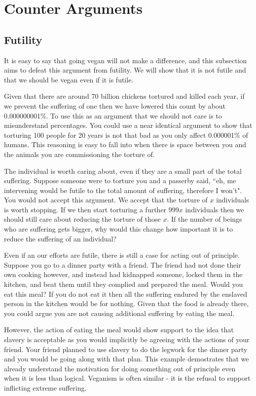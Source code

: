 \section{Counter Arguments}
\label{sec:CounterArguments}

\subsection{Futility}

It is easy to say that going vegan will not make a difference, and this subsection aims to defeat this argument from futility. We will show that it is not futile and that we should be vegan even if it is futile.

Given that there are around 70 billion chickens tortured and killed each year, if we prevent the suffering of one then we have lowered this count by about 0.000000001\%. To use this as an argument that we should not care is to misunderstand percentages. You could use a near identical argument to show that torturing 100 people for 20 years is not that bad as you only affect 0.000001\% of humans. This reasoning is easy to fall into when there is space between you and the animals you are commissioning the torture of.

The individual is worth caring about, even if they are a small part of the total suffering. Suppose someone were to torture you and a passerby said, ``eh, me intervening would be futile to the total amount of suffering, therefore I won't". You would not accept this argument. We accept that the torture of $x$ individuals is worth stopping. If we then start torturing a further $999x$ individuals then we should still care about reducing the torture of those $x$. If the number of beings who are suffering gets bigger, why would this change how important it is to reduce the suffering of an individual?

Even if an our efforts are futile, there is still a case for acting out of principle. Suppose you go to a dinner party with a friend. The friend had not done their own cooking however, and instead had kidnapped someone, locked them in the kitchen, and beat them until they complied and prepared the meal. Would you eat this meal? If you do not eat it then all the suffering endured by the enslaved person in the kitchen would be for nothing. Given that the food is already there, you could argue you are not causing additional suffering by eating the meal.

However, the action of eating the meal would show support to the idea that slavery is acceptable as you would implicitly be agreeing with the actions of your friend. Your friend planned to use slavery to do the legwork for the dinner party and you would be going along with that plan. This example demostrates that we already understand the motivation for doing something out of principle even when it is less than logical. Veganism is often similar - it is the refusal to support inflicting extreme suffering.

